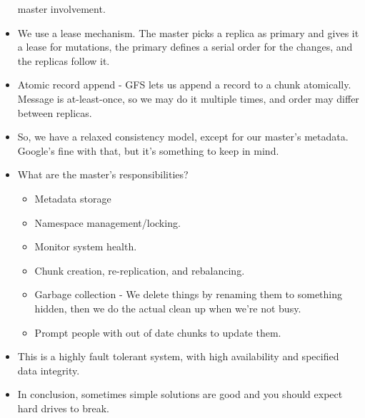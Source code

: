 \documentclass{scrartcl}
\begin{document}
\begin{itemize}
	master involvement.
\item We use a lease mechanism. The master picks a replica as primary and
	gives it a lease for mutations, the primary defines a serial order for the
	changes, and the replicas follow it.
\item Atomic record append - GFS lets us append a record to a chunk atomically.
	Message is at-least-once, so we may do it multiple times, and order may
	differ between replicas.
\item So, we have a relaxed consistency model, except for our master's metadata.
	Google's fine with that, but it's something to keep in mind.
\item What are the master's responsibilities?
	\begin{itemize}
	\item Metadata storage
	\item Namespace management/locking.
	\item Monitor system health.
	\item Chunk creation, re-replication, and rebalancing.
	\item Garbage collection - We delete things by renaming them to something
		hidden, then we do the actual clean up when we're not busy.
	\item Prompt people with out of date chunks to update them.
	\end{itemize}
\item This is a highly fault tolerant system, with high availability and
	specified data integrity.
\item In conclusion, sometimes simple solutions are good and you should
	expect hard drives to break.

\end{itemize}
\end{document}
